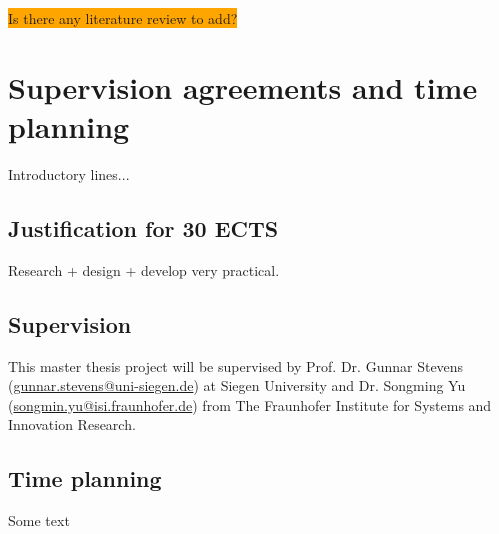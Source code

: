 \colorbox{orange}{Is there any literature review to add?}

\section{Supervision agreements and time planning} 

Introductory lines...

\subsection{Justification for 30 ECTS}

Research + design + develop
very practical. 

\subsection{Supervision}

This master thesis project will be supervised by 
Prof. Dr. Gunnar Stevens (\href{mailto:gunnar.stevens@uni-siegen.de}{gunnar.stevens@uni-siegen.de}) at Siegen University and 
Dr. Songming Yu (\href{mailto:songmin.yu@isi.fraunhofer.de}{songmin.yu@isi.fraunhofer.de}) from The Fraunhofer Institute for Systems and Innovation Research. 

\subsection{Time planning}

Some text \\

